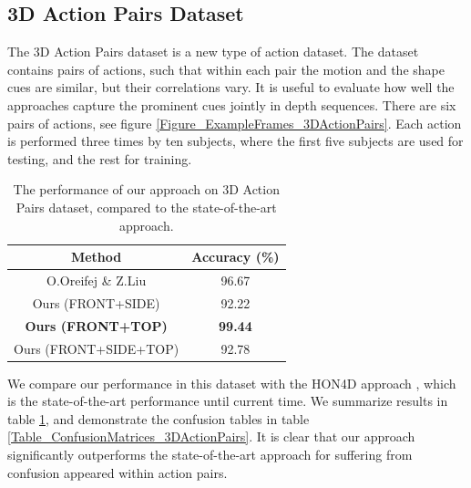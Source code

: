 \documentclass[final,3p,times,twocolumn]{elsarticle}
\begin{document}
\subsection{3D Action Pairs Dataset}

The 3D Action Pairs dataset \cite{oreifej2013hon4d} is a new type of action dataset.
The dataset contains pairs of actions, such that within each pair the motion and the shape cues are similar, but their correlations vary.
It is useful to evaluate how well the approaches capture the prominent cues jointly in depth sequences.
There are six pairs of actions, see figure \ref{Figure_ExampleFrames_3DActionPairs}.
Each action is performed three times by ten subjects, where the first five subjects are used for testing, and the rest for training.

\begin{table}[H]
	\begin{tabular}{c|c}	
		    \bf Method & \bf Accuracy (\%) \\
		\hline
		O.Oreifej \& Z.Liu \cite{oreifej2013hon4d}&      96.67 \\
		\hline
		Ours (FRONT+SIDE) &      92.22 \\
		
		\bf Ours (FRONT+TOP) &      \bf 99.44 \\
		
		Ours (FRONT+SIDE+TOP) &      92.78 \\
	
	\end{tabular}  
	
	\caption{The performance of our approach on 3D Action Pairs dataset, compared to the state-of-the-art approach.}
	\label{Table_3DActionPairs_SoA}
\end{table}

We compare our performance in this dataset with the HON4D approach \cite{oreifej2013hon4d}, which is the state-of-the-art performance until current time.
We summarize results in table \ref{Table_3DActionPairs_SoA}, and demonstrate the confusion tables in table \ref{Table_ConfusionMatrices_3DActionPairs}.
It is clear that our approach significantly outperforms the state-of-the-art approach for suffering from confusion appeared within action pairs.
\end{document}
